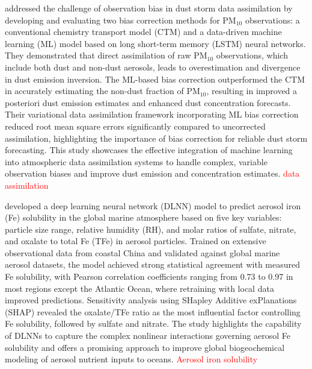 \documentclass[11pt]{article}
\begin{document}
\citet{jin2019machine} addressed the challenge of observation bias in dust storm data assimilation by developing and evaluating two bias correction methods for PM$_{10}$ observations: a conventional chemistry transport model (CTM) and a data-driven machine learning (ML) model based on long short-term memory (LSTM) neural networks. They demonstrated that direct assimilation of raw PM$_{10}$ observations, which include both dust and non-dust aerosols, leads to overestimation and divergence in dust emission inversion. The ML-based bias correction outperformed the CTM in accurately estimating the non-dust fraction of PM$_{10}$, resulting in improved a posteriori dust emission estimates and enhanced dust concentration forecasts. Their variational data assimilation framework incorporating ML bias correction reduced root mean square errors significantly compared to uncorrected assimilation, highlighting the importance of bias correction for reliable dust storm forecasting. This study showcases the effective integration of machine learning into atmospheric data assimilation systems to handle complex, variable observation biases and improve dust emission and concentration estimates. \textcolor{red}{data assimilation}

\citet{shi2022aerosol} developed a deep learning neural network (DLNN) model to predict aerosol iron (Fe) solubility in the global marine atmosphere based on five key variables: particle size range, relative humidity (RH), and molar ratios of sulfate, nitrate, and oxalate to total Fe (TFe) in aerosol particles. Trained on extensive observational data from coastal China and validated against global marine aerosol datasets, the model achieved strong statistical agreement with measured Fe solubility, with Pearson correlation coefficients ranging from 0.73 to 0.97 in most regions except the Atlantic Ocean, where retraining with local data improved predictions. Sensitivity analysis using SHapley Additive exPlanations (SHAP) revealed the oxalate/TFe ratio as the most influential factor controlling Fe solubility, followed by sulfate and nitrate. The study highlights the capability of DLNNs to capture the complex nonlinear interactions governing aerosol Fe solubility and offers a promising approach to improve global biogeochemical modeling of aerosol nutrient inputs to oceans. \textcolor{red}{Aerosol iron solubility}
\end{document}
